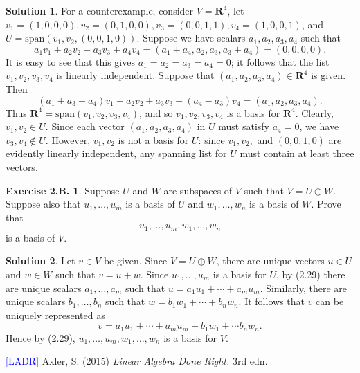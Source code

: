 \documentclass[12pt]{article}
\theoremstyle{definition}
\theoremstyle{exercise}
\newtheorem{exercise}{Exercise 2.B.}
\theoremstyle{solution}
\newtheorem*{solution}{Solution}
\newcommand{\Span}{\text{span}}
\newcommand{\R}{\mathbf{R}}
\begin{document}
\begin{solution}
    For a counterexample, consider \( V = \R^4 \), let \( v_1 = (1, 0, 0, 0), v_2 = (0, 1, 0, 0) , v_3 = (0, 0, 1, 1), v_4 = (1, 0, 0, 1) \), and \( U = \Span(v_1, v_2, (0, 0, 1, 0)) \). Suppose we have scalars \( a_1, a_2, a_3, a_4 \) such that
    \[
        a_1 v_1 + a_2 v_2 + a_3 v_3 + a_4 v_4 = (a_1 + a_4, a_2, a_3, a_3 + a_4) = (0, 0, 0, 0).
    \]
    It is easy to see that this gives \( a_1 = a_2 = a_3 = a_4 = 0 \); it follows that the list \( v_1, v_2, v_3, v_4 \) is linearly independent. Suppose that \( (a_1, a_2, a_3, a_4) \in \R^4 \) is given. Then
    \[
        (a_1 + a_3 - a_4) v_1 + a_2 v_2 + a_3 v_3 + (a_4 - a_3) v_4 = (a_1, a_2, a_3, a_4).
    \]
    Thus \( \R^4 = \Span(v_1, v_2, v_3, v_4) \), and so \( v_1, v_2, v_3, v_4 \) is a basis for \( \R^4 \). Clearly, \( v_1, v_2 \in U \). Since each vector \( (a_1, a_2, a_3, a_4) \) in \( U \) must satisfy \( a_4 = 0 \), we have \( v_3, v_4 \not\in U \). However, \( v_1, v_2 \) is not a basis for \( U \): since \( v_1, v_2, \) and \( (0, 0, 1, 0) \) are evidently linearly independent, any spanning list for \( U \) must contain at least three vectors.
\end{solution}

\begin{exercise}
\label{ex:8}
    Suppose \( U \) and \( W \) are subspaces of \( V \) such that \( V = U \oplus W \). Suppose also that \( u_1, \ldots, u_m \) is a basis of \( U \) and \( w_1, \ldots, w_n \) is a basis of \( W \). Prove that
    \[
        u_1, \ldots, u_m, w_1, \ldots, w_n
    \]
    is a basis of \( V \).
\end{exercise}

\begin{solution}
    Let \( v \in V \) be given. Since \( V = U \oplus W \), there are unique vectors \( u \in U \) and \( w \in W \) such that \( v = u + w \). Since \( u_1, \ldots, u_m \) is a basis for \( U \), by (2.29) there are unique scalars \( a_1, \ldots, a_m \) such that \( u = a_1 u_1 + \cdots + a_m u_m \). Similarly, there are unique scalars \( b_1, \ldots, b_n \) such that \( w = b_1 w_1 + \cdots + b_n w_n \). It follows that \( v \) can be uniquely represented as
    \[
        v = a_1 u_1 + \cdots + a_m u_m + b_1 w_1 + \cdots b_n w_n.
    \]
    Hence by (2.29), \( u_1, \ldots, u_m, w_1, \ldots, w_n \) is a basis for \( V \).
\end{solution}

\noindent \hrulefill

\noindent \hypertarget{ladr}{\textcolor{blue}{[LADR]} Axler, S. (2015) \textit{Linear Algebra Done Right.} 3rd edn.}
\end{document}
